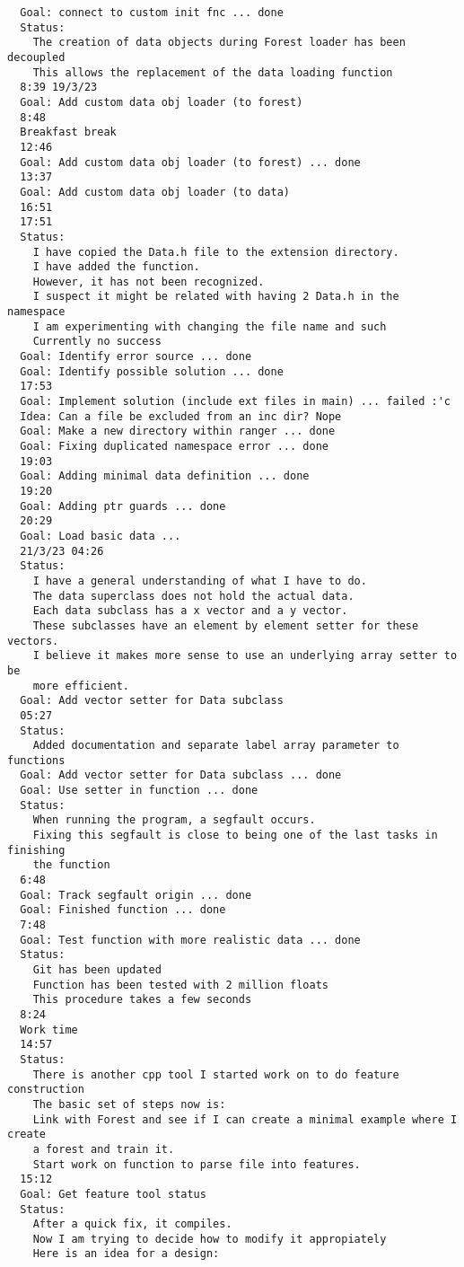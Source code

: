 \documentclass[12pt,oneside]{book}
\begin{document}
\begin{lstlisting}
  Goal: connect to custom init fnc ... done
  Status:
    The creation of data objects during Forest loader has been decoupled
    This allows the replacement of the data loading function
  8:39 19/3/23
  Goal: Add custom data obj loader (to forest)
  8:48
  Breakfast break
  12:46
  Goal: Add custom data obj loader (to forest) ... done
  13:37
  Goal: Add custom data obj loader (to data)
  16:51
  17:51
  Status:
    I have copied the Data.h file to the extension directory.
    I have added the function.
    However, it has not been recognized.
    I suspect it might be related with having 2 Data.h in the namespace
    I am experimenting with changing the file name and such
    Currently no success
  Goal: Identify error source ... done
  Goal: Identify possible solution ... done
  17:53
  Goal: Implement solution (include ext files in main) ... failed :'c
  Idea: Can a file be excluded from an inc dir? Nope
  Goal: Make a new directory within ranger ... done
  Goal: Fixing duplicated namespace error ... done
  19:03
  Goal: Adding minimal data definition ... done
  19:20
  Goal: Adding ptr guards ... done
  20:29
  Goal: Load basic data ... 
  21/3/23 04:26
  Status:
    I have a general understanding of what I have to do.
    The data superclass does not hold the actual data.
    Each data subclass has a x vector and a y vector.
    These subclasses have an element by element setter for these vectors.
    I believe it makes more sense to use an underlying array setter to be
    more efficient.
  Goal: Add vector setter for Data subclass
  05:27
  Status:
    Added documentation and separate label array parameter to functions
  Goal: Add vector setter for Data subclass ... done
  Goal: Use setter in function ... done
  Status:
    When running the program, a segfault occurs.
    Fixing this segfault is close to being one of the last tasks in finishing
    the function
  6:48
  Goal: Track segfault origin ... done
  Goal: Finished function ... done
  7:48
  Goal: Test function with more realistic data ... done
  Status:
    Git has been updated
    Function has been tested with 2 million floats
    This procedure takes a few seconds
  8:24
  Work time
  14:57
  Status:
    There is another cpp tool I started work on to do feature construction
    The basic set of steps now is:
    Link with Forest and see if I can create a minimal example where I create
    a forest and train it.
    Start work on function to parse file into features.
  15:12
  Goal: Get feature tool status
  Status:
    After a quick fix, it compiles.
    Now I am trying to decide how to modify it appropiately
    Here is an idea for a design:


\end{lstlisting}
\end{document}
